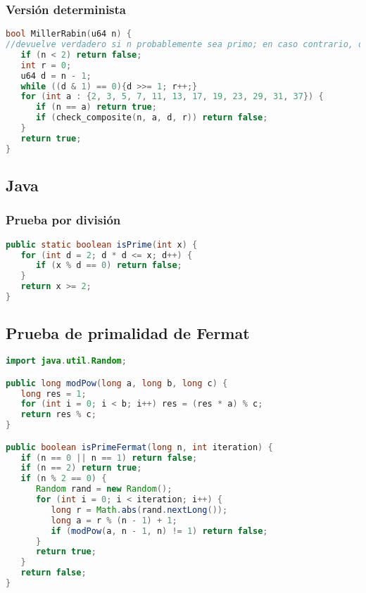 \subsubsection{Versión determinista}
\begin{lstlisting}[language=C++]
bool MillerRabin(u64 n) { 
//devuelve verdadero si n probablemente sea primo; en caso contrario, devuelve falso.
   if (n < 2) return false;
   int r = 0;
   u64 d = n - 1;
   while ((d & 1) == 0){d >>= 1; r++;}
   for (int a : {2, 3, 5, 7, 11, 13, 17, 19, 23, 29, 31, 37}) {
      if (n == a) return true;
      if (check_composite(n, a, d, r)) return false;
   }
   return true;
}
\end{lstlisting} 



\subsection{Java}

\subsubsection{Prueba por división}
\begin{lstlisting}[language=Java]
public static boolean isPrime(int x) {
   for (int d = 2; d * d <= x; d++) {
      if (x % d == 0) return false;
   }
   return x >= 2;
}
\end{lstlisting} 

\subsection{Prueba de primalidad de Fermat}
\begin{lstlisting}[language=Java]
import java.util.Random;

public long modPow(long a, long b, long c) {
   long res = 1;
   for (int i = 0; i < b; i++) res = (res * a) % c;
   return res % c;
}

public boolean isPrimeFermat(long n, int iteration) {
   if (n == 0 || n == 1) return false;
   if (n == 2) return true;
   if (n % 2 == 0) {
      Random rand = new Random();
      for (int i = 0; i < iteration; i++) {
         long r = Math.abs(rand.nextLong());
         long a = r % (n - 1) + 1;
         if (modPow(a, n - 1, n) != 1) return false;
      }
      return true;
   }
   return false;
}
\end{lstlisting} 


